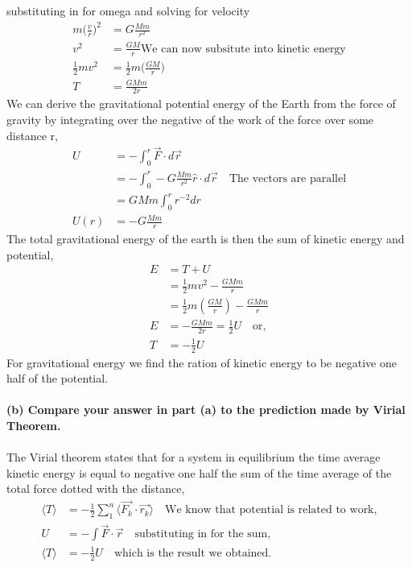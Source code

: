 \documentclass[paper=a4, fontsize=11pt]{scrartcl} %
\numberwithin{equation}{section} %
\numberwithin{figure}{section} %
\numberwithin{table}{section} %
\begin{document}
substituting in for omega and solving for velocity
\begin{align*}
m \bigg(\frac{v}{r} \bigg)^2 & = G \frac{Mm}{r^2} \\
v^2 & = \frac{GM}{r} \text{We can now subsitute into kinetic energy}\\
\frac{1}{2}mv^2 & = \frac{1}{2}m\bigg( \frac{GM}{r} \bigg)\\
T & = \frac{GMm}{2r}
\end{align*}
We can derive the gravitational potential energy of the Earth from the force of gravity by integrating over the negative of the work of the force over some distance r,
\begin{align*}
U & = -\int_0^r \vec{F}\cdot d\vec{r} \\
& = -\int_0^r -G\frac{Mm}{r^2}\hat{r} \cdot d\vec{r} \quad \text{The vectors are parallel} \\
& = GMm\int_0^r r^{-2} dr \\
U(r) & = - G\frac{Mm}{r}
\end{align*}
The total gravitational energy of the earth is then the sum of kinetic energy and potential,
\begin{align*}
E  &= T + U\\
& = \frac{1}{2}mv^2  - \frac{GMm}{r}\\
& = \frac{1}{2}m (\frac{GM}{r}) - \frac{GMm}{r} \\
E & = - \frac{GMm}{2r} = \frac{1}{2}U \quad \text{or,} \\
T & = -\frac{1}{2}U
\end{align*}
For gravitational energy we find the ration of kinetic energy to be negative one half of the potential.\\
\\
\textbf{(b) Compare your answer in part (a) to the prediction made by Virial Theorem.}\\
\\
The Virial theorem states that for a system in equilibrium the time average kinetic energy is equal to negative one half the sum of the time average of the total force dotted with the distance,
\begin{align*}
\langle T\rangle & = -\frac{1}{2}\sum_1^{n} \langle \vec{F_k} \cdot \vec{r_k} \rangle \quad \text{We know that potential is related to work,} \\
U & = - \int \vec{F} \cdot \vec{r} \quad \text{substituting in for the sum,} \\
\langle T\rangle & = -\frac{1}{2} U \quad \text{which is the result we obtained.}
\end{align*}
 
\end{document}
